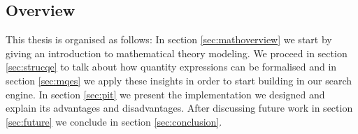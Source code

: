 
\subsection{Overview}

This thesis is organised as follows: In section \ref{sec:mathoverview} we start by giving an introduction to mathematical theory modeling. We proceed in section \ref{sec:strucqe} to talk about how quantity expressions can be formalised and in section \ref{sec:mqes} we apply these insights in order to start building in our search engine. In section \ref{sec:pit} we present the implementation we designed and explain its advantages and disadvantages. After discussing future work in section \ref{sec:future} we conclude in section \ref{sec:conclusion}.
